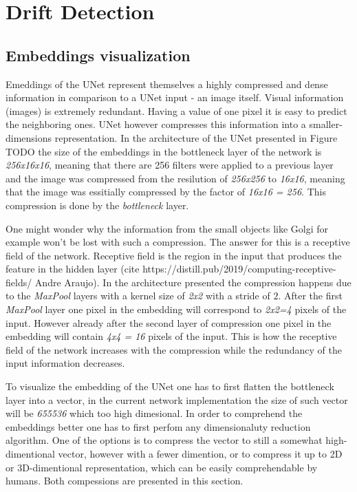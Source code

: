 \section{Drift Detection}
\subsection{Embeddings visualization}
Emeddings of the UNet represent themselves a highly compressed and dense information in comparison to a UNet input - an image itself. Visual information (images) is extremely redundant. Having a value of one pixel it is easy to predict the neighboring ones. UNet however compresses this information into a smaller-dimensions representation. In the architecture of the UNet presented in Figure TODO the size of the embeddings in the bottleneck layer of the network is \textit{256x16x16}, meaning that there are 256 filters were applied to a previous layer and the image was compressed from the resilution of \textit{256x256} to \textit{16x16}, meaning that the image was essitially compressed by the factor of \textit{16x16 = 256}. This compression is done by the \textit{bottleneck} layer.

One might wonder why the information from the small objects like Golgi for example won't be lost with such a compression. The answer for this is a receptive field of the network. Receptive field is the region in the input that produces the feature in the hidden layer (cite https://distill.pub/2019/computing-receptive-fields/ Andre Araujo). In the architecture presented the compression happens due to the \textit{MaxPool} layers with a kernel size of \textit{2x2} with a stride of $2$. After the first \textit{MaxPool} layer one pixel in the embedding will correspond to \textit{2x2=4} pixels of the input. However already after the second layer of compression one pixel in the embedding will contain \textit{4x4 = 16} pixels of the input. This is how the receptive field of the network increases with the compression while the redundancy of the input information decreases.

To visualize the embedding of the UNet one has to first flatten the bottleneck layer into a vector, in the current network implementation the size of such vector will be \textit{655536} which too high dimesional. In order to comprehend the embeddings better one has to first perfom any dimensionaluty reduction algorithm. One of the options is to compress the vector to still a somewhat high-dimentional vector, however with a fewer dimention, or to compress it up to 2D or 3D-dimentional representation, which can be easily comprehendable by humans. Both compessions are presented in this section.

